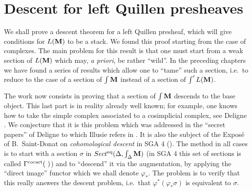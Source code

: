 %

\clearpage
\section{Descent for left Quillen presheaves}
\label{quidescentepage}

We shall prove a descent theorem for a left Quillen presheaf, which will
give conditions for $L({\bf M} )$ to be a stack. We found this proof starting
from the case of complexes. The main problem for this result is that one
must start from a weak section of $L({\bf M} )$ which may, {\em a priori}, be
rather ``wild''. In the preceding chapters we have found a series of results
which allow one to ``tame'' such a section, i.e.\ to reduce to the case of a
section of $\int {\bf M}$ instead of a section of $\int 'L({\bf M} )$.

The work now consists in proving that a section of $\int {\bf M}$ descends to
the base object. This last part is in reality already well known; for
example, one knows how to take the simple complex associated to a
cosimplicial complex, see Deligne \cite{HodgeIII}. We conjecture that it is
this problem which was addressed in the ``secret papers'' of Deligne to
which Illusie refers in \cite{Illusie}. It is also the subject of the Exposé
of B.~Saint-Donat on {\em cohomological descent} in SGA 4 (\cite{SGA4}). The
method in all cases is to start with a section $\sigma$ in
$Sect ^{\rm eq} (\Delta , \int _{\Delta} {\bf M} )$ (in SGA 4 this set of
sections is called $\Gamma ^{\rm cocart}(\, \, )$) and to ``descend'' it via
the augmentation, by applying the ``direct image'' functor which we shall
denote $\varphi _{\ast}$. The problem is to verify that this really answers
the descent problem, i.e.\ that
$\varphi ^{\ast} (\varphi _{\ast} \sigma )$ is equivalent to $\sigma$.


